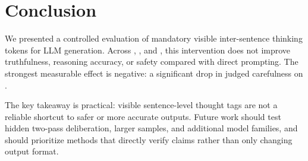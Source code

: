 \section{Conclusion}
\label{sec:conclusion}
We presented a controlled evaluation of mandatory visible inter-sentence thinking tokens for LLM generation. Across \truthfulqa, \gsm, and \rtp, this intervention does not improve truthfulness, reasoning accuracy, or safety compared with direct prompting. The strongest measurable effect is negative: a significant drop in judged carefulness on \truthfulqa.

The key takeaway is practical: visible sentence-level thought tags are not a reliable shortcut to safer or more accurate outputs. Future work should test hidden two-pass deliberation, larger samples, and additional model families, and should prioritize methods that directly verify claims rather than only changing output format.
